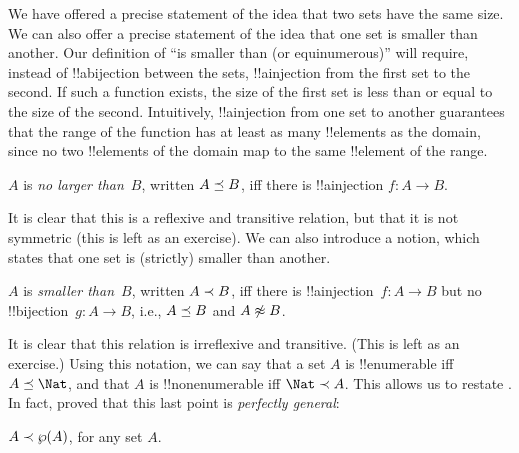 \documentclass[../../../include/open-logic-section]{subfiles}
\begin{document}


\begin{explain}
We have offered a precise statement of the idea that two sets have the
same size. We can also offer a precise statement of the idea that one
set is smaller than another. Our definition of ``is smaller than (or
equinumerous)'' will require, instead of !!a{bijection} between the
sets, !!a{injection} from the first set to the second. If such a
function exists, the size of the first set is less than or equal to
the size of the second. Intuitively, !!a{injection} from one set to
another guarantees that the range of the function has at least as many
!!{element}s as the domain, since no two !!{element}s of the domain
map to the same !!{element} of the range.
\end{explain}

\begin{defn}
$A$ is \emph{no larger than}~$B$, written $A \preceq B$, iff there
is !!a{injection} $f \colon A \to B$.
\end{defn}

It is clear that this is a reflexive and transitive relation, but that
it is not symmetric (this is left as an exercise). We can also
introduce a notion, which states that one set is (strictly) smaller
than another. 

\begin{defn}
$A$ is \emph{smaller than}~$B$, written $A \prec B$, iff there
is !!a{injection}~$f\colon A \to B$ but no !!{bijection}~$g\colon A
\to B$, i.e., $A \preceq B$ and $A \not\approx B$.
\end{defn}

It is clear that this relation is irreflexive
and transitive. (This is left as an exercise.) Using this notation, we
can say that a set $A$ is !!{enumerable} iff $\cardle{A}{\Nat}$, and
that $A$ is !!{nonenumerable} iff $\cardless{\Nat}{A}$. This allows us
to restate
. In fact,
\citet{Cantor1892} proved that this last point is \emph{perfectly
general}:

\begin{thm}[Cantor]
$A \prec \wp(A)$, for any set $A$.
\end{thm}
\end{document}
